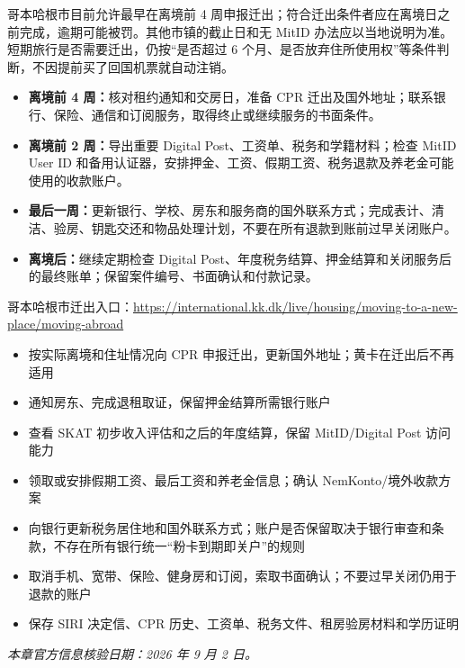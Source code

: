 哥本哈根市目前允许最早在离境前 4 周申报迁出；符合迁出条件者应在离境日之前完成，逾期可能被罚。其他市镇的截止日和无 MitID 办法应以当地说明为准。短期旅行是否需要迁出，仍按“是否超过 6 个月、是否放弃住所使用权”等条件判断，不因提前买了回国机票就自动注销。

\begin{itemize}[leftmargin=2em,itemsep=3pt]
  \item \textbf{离境前 4 周：}核对租约通知和交房日，准备 CPR 迁出及国外地址；联系银行、保险、通信和订阅服务，取得终止或继续服务的书面条件。
  \item \textbf{离境前 2 周：}导出重要 Digital Post、工资单、税务和学籍材料；检查 MitID User ID 和备用认证器，安排押金、工资、假期工资、税务退款及养老金可能使用的收款账户。
  \item \textbf{最后一周：}更新银行、学校、房东和服务商的国外联系方式；完成表计、清洁、验房、钥匙交还和物品处理计划，不要在所有退款到账前过早关闭账户。
  \item \textbf{离境后：}继续定期检查 Digital Post、年度税务结算、押金结算和关闭服务后的最终账单；保留案件编号、书面确认和付款记录。
\end{itemize}

哥本哈根市迁出入口：\url{https://international.kk.dk/live/housing/moving-to-a-new-place/moving-abroad}

\begin{itemize}[label=$\bigcirc$,leftmargin=2.2em,itemsep=3pt]
  \item 按实际离境和住址情况向 CPR 申报迁出，更新国外地址；黄卡在迁出后不再适用
  \item 通知房东、完成退租取证，保留押金结算所需银行账户
  \item 查看 SKAT 初步收入评估和之后的年度结算，保留 MitID/Digital Post 访问能力
  \item 领取或安排假期工资、最后工资和养老金信息；确认 NemKonto/境外收款方案
  \item 向银行更新税务居住地和国外联系方式；账户是否保留取决于银行审查和条款，不存在所有银行统一“粉卡到期即关户”的规则
  \item 取消手机、宽带、保险、健身房和订阅，索取书面确认；不要过早关闭仍用于退款的账户
  \item 保存 SIRI 决定信、CPR 历史、工资单、税务文件、租房验房材料和学历证明
\end{itemize}

\noindent\textit{本章官方信息核验日期：2026 年 9 月 2 日。}
